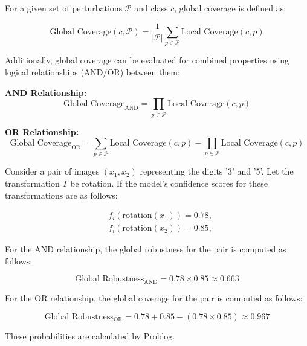 For a given set of perturbations \( \mathcal{P} \) and class \( c \), global coverage is defined as:

\begin{equation}
\text{Global Coverage}(c, \mathcal{P}) = \frac{1}{|\mathcal{P}|} \sum_{p \in \mathcal{P}} \text{Local Coverage}(c, p)
\end{equation}

Additionally, global coverage can be evaluated for combined properties using logical relationships (AND/OR) between them:

\textbf{AND Relationship:} 
\begin{equation}
\text{Global Coverage}_{\text{AND}} = \prod_{p \in \mathcal{P}} \text{Local Coverage}(c, p)
\end{equation}

\textbf{OR Relationship:}
\begin{equation}
\text{Global Coverage}_{\text{OR}} = \sum_{p \in \mathcal{P}} \text{Local Coverage}(c, p) - \prod_{p \in \mathcal{P}} \text{Local Coverage}(c, p)
\end{equation}

\begin{example}
Consider a pair of images \( (x_1, x_2) \) representing the digits '3' and '5'. Let the transformation \( T \) be rotation. If the model's confidence scores for these transformations are as follows:

\begin{equation}
\begin{aligned}
&f_i(\text{rotation}(x_1)) = 0.78, \\
&f_i(\text{rotation}(x_2)) = 0.85,
\end{aligned}
\end{equation}

For the AND relationship, the global robustness for the pair is computed as follows:

\begin{equation}
\text{Global Robustness}_{\text{AND}} = 0.78 \times 0.85 \approx 0.663
\end{equation}

For the OR relationship, the global coverage for the pair is computed as follows:

\begin{equation}
\text{Global Robustness}_{\text{OR}} = 0.78 + 0.85 - (0.78 \times 0.85) \approx 0.967
\end{equation}

These probabilities are calculated by Problog.

\end{example}


